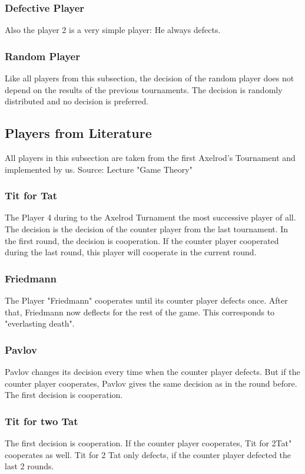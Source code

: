 \documentclass[11pt,twoside]{article}
\begin{document}
\subsubsection{Defective Player}
Also the player 2 is a very simple player: He always defects. 

\subsubsection{Random Player}
Like all players from this subsection, the decision of the random player does not depend on the results of the previous tournaments. The decision is randomly distributed and no decision is preferred.

\subsection{Players from Literature}

All players in this subsection are taken from the first Axelrod's Tournament and implemented by us. Source: Lecture "Game Theory" \cite{donninger}

\subsubsection{Tit for Tat}
The Player 4 during to the Axelrod Turnament the most successive player of all\cite{donninger}. The decision is the decision of the counter player from the last tournament. In the first round, the decision is cooperation. If the counter player cooperated during the last round, this player will cooperate in the current round.

\subsubsection{Friedmann}
The Player "Friedmann" cooperates until its counter player defects once. After that, Friedmann now deflects for the rest of the game. This corresponds to "everlasting death".

\subsubsection{Pavlov}
Pavlov changes its decision every time when the counter player defects. But if the counter player cooperates, Pavlov gives the same decision as in the round before. The first decision is cooperation. 

\subsubsection{Tit for two Tat}
The first decision is cooperation. If the counter player cooperates, Tit for 2Tat" cooperates as well. Tit for 2 Tat only defects, if the counter player defected the last 2 rounds.
\end{document}
